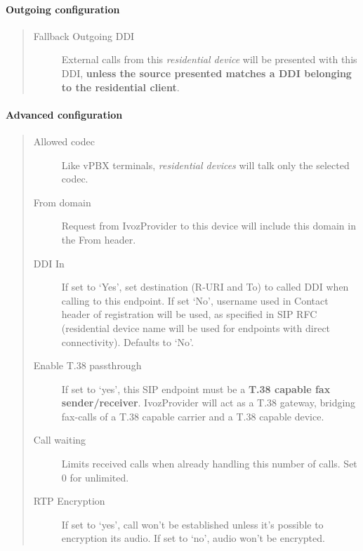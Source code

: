 \documentclass[letterpaper,10pt,spanish]{sphinxmanual}
\begin{document}
\paragraph{Outgoing configuration}
\label{administration_portal/client/residential/residential_devices:outgoing-configuration}\begin{quote}
\begin{description}
\item[{Fallback Outgoing DDI}] \leavevmode
External calls from this \emph{residential device} will be presented with this DDI, \textbf{unless
the source presented matches a DDI belonging to the residential client}.

\end{description}
\end{quote}


\paragraph{Advanced configuration}
\label{administration_portal/client/residential/residential_devices:advanced-configuration}\begin{quote}
\begin{description}
\item[{Allowed codec}] \leavevmode
Like vPBX terminals, \emph{residential devices} will talk only the selected codec.

\item[{From domain}] \leavevmode
Request from IvozProvider to this device will include this domain in
the From header.

\item[{DDI In}] \leavevmode
If set to `Yes', set destination (R-URI and To) to called DDI when calling to this endpoint. If set `No', username
used in Contact header of registration will be used, as specified in SIP RFC (residential device name will be used
for endpoints with direct connectivity). Defaults to `No'.

\item[{Enable T.38 passthrough}] \leavevmode
If set to `yes', this SIP endpoint must be a \textbf{T.38 capable fax sender/receiver}. IvozProvider
will act as a T.38 gateway, bridging fax-calls of a T.38 capable carrier and a T.38 capable device.

\item[{Call waiting}] \leavevmode
Limits received calls when already handling this number of calls. Set 0 for unlimited.

\item[{RTP Encryption}] \leavevmode
If set to `yes', call won't be established unless it's possible to encryption its audio. If set to `no',
audio won't be encrypted.

\end{description}
\end{quote}
\end{document}
